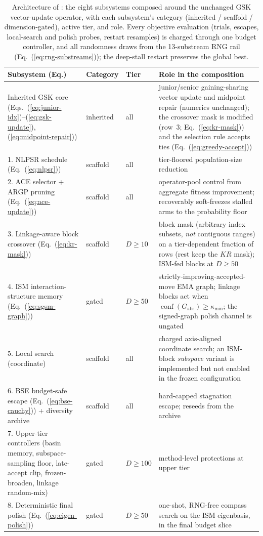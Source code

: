 \begin{table}[t]
\caption{Architecture of \dtgsk{}: the eight subsystems composed
around the unchanged GSK vector-update operator, with each subsystem's category
(inherited / scaffold / dimension-gated), active tier, and role. Every
objective evaluation (trials, escapes, local-search and polish probes,
restart resamples) is charged through one budget controller, and all
randomness draws from the 13-substream RNG rail
(Eq.~(\ref{eq:rng-substreams})); the deep-stall restart preserves the global
best.}
\label{tab:architecture}
\centering
\footnotesize
\zebra
\begin{tabular}{p{3.3cm}ll p{6.5cm}}
\toprule
\textbf{Subsystem (Eq.)} & \textbf{Category} & \textbf{Tier} & \textbf{Role in the composition} \\
\midrule
Inherited GSK core (Eqs.~(\ref{eq:junior-idx})--(\ref{eq:gsk-update}), (\ref{eq:midpoint-repair})) & inherited & all & junior/senior gaining-sharing vector update and midpoint repair (numerics unchanged); the crossover mask is modified (row~3; Eq.~(\ref{eq:kr-mask})) and the selection rule accepts ties (Eq.~(\ref{eq:greedy-accept})) \\
1. NLPSR schedule (Eq.~(\ref{eq:nlpsr})) & scaffold & all & tier-floored population-size reduction \\
2. ACE selector + ARGP pruning (Eq.~(\ref{eq:ace-update})) & scaffold & all & operator-pool control from aggregate fitness improvement; recoverably soft-freezes stalled arms to the probability floor \\
3. Linkage-aware block crossover (Eq.~(\ref{eq:kr-mask})) & scaffold & $D{\ge}10$ & block mask (arbitrary index subsets, \emph{not} contiguous ranges) on a tier-dependent fraction of rows (rest keep the $KR$ mask); ISM-fed blocks at $D{\ge}50$ \\
4. ISM interaction-structure memory (Eq.~(\ref{eq:sgsm-graph})) & gated & $D{\ge}50$ & strictly-improving-accepted-move EMA graph; linkage blocks act when $\operatorname{conf}(G_{\mathrm{abs}})\ge\kappa_{\min}$; the signed-graph polish channel is ungated \\
5. Local search (coordinate) & scaffold & all & charged axis-aligned coordinate search; an ISM-block \emph{subspace} variant is implemented but not enabled in the frozen configuration \\
6. BSE budget-safe escape (Eq.~(\ref{eq:bse-cauchy})) + diversity archive & scaffold & all & hard-capped stagnation escape; reseeds from the archive \\
7. Upper-tier controllers (basin memory, subspace-sampling floor, late-accept clip, frozen-broaden, linkage random-mix) & gated & $D{\ge}100$ & method-level protections at upper tier \\
8. Deterministic final polish (Eq.~(\ref{eq:eigen-polish})) & gated & $D{\ge}50$ & one-shot, RNG-free compass search on the ISM eigenbasis, in the final budget slice \\
\bottomrule
\end{tabular}
\end{table}

